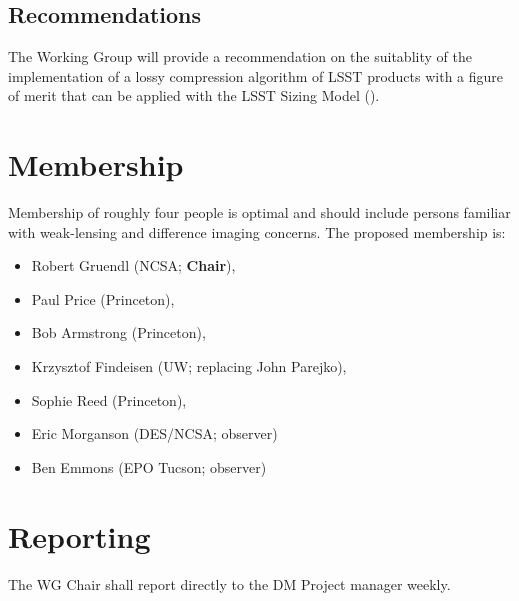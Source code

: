 \subsection{Recommendations}

The Working Group will provide a recommendation on the suitablity of the implementation
of a lossy compression algorithm of LSST products with a figure of merit that can be
applied with the LSST Sizing Model ().


\section{Membership}

Membership of roughly four people is optimal and should include persons familiar
with weak-lensing and difference imaging concerns.
The proposed membership is:

\begin{itemize}
    \item Robert Gruendl (NCSA; \textbf{Chair}),
    \item Paul Price (Princeton),
    \item Bob Armstrong (Princeton),
    \item Krzysztof Findeisen (UW; replacing John Parejko),
    \item Sophie Reed (Princeton),
    \item Eric Morganson (DES/NCSA; observer)
    \item Ben Emmons (EPO Tucson; observer)
\end{itemize}


\section{Reporting}

The WG Chair shall report directly to the DM Project manager weekly.
